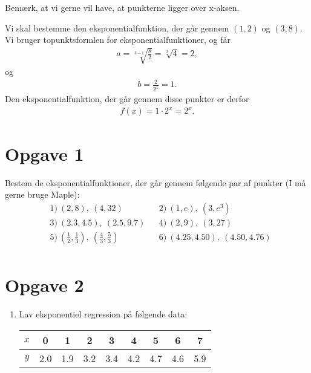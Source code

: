Bemærk, at vi gerne vil have, at punkterne ligger over x-aksen.
\begin{exa}
Vi skal bestemme den eksponentialfunktion, der går gennem $(1,2)$ og $(3,8)$. Vi bruger topunktsformlen for eksponentialfunktioner, og får
\begin{align*}
a = \sqrt[3-1]{\frac{8}{2}} = \sqrt[2]{4} = 2, 
\end{align*}
og 
\begin{align*}
b = \frac{2}{2^{1}} = 1.
\end{align*}
Den eksponentialfunktion, der går gennem disse punkter er derfor 
\begin{align*}
f(x) = 1\cdot 2^x = 2^x.
\end{align*}
\end{exa}

\section*{Opgave 1}
Bestem de eksponentialfunktioner, der går gennem følgende par af punkter (I må gerne bruge Maple):
\begin{align*}
&1) \ (2,8),\  (4,32)    &&2) \ (1,e), \ (3,e^3)     \\
&3) \ (2.3,4.5), \  (2.5,9.7)   &&4) \  (2,9), \ (3,27)    \\
&5) \ (\frac{1}{2},\frac{1}{3}), \ (\frac{4}{3},\frac{5}{3})   &&6) \ (4.25,4.50), \ (4.50,4.76)     \\
\end{align*}

\section*{Opgave 2}
\begin{enumerate}[label=\roman*)]
\item Lav eksponentiel regression på følgende data:
\begin{center}
\begin{tabular}{c|cccccccc}
$x$ & 0 & 1 & 2 & 3 & 4 & 5 & 6 & 7\\
\hline
$y$ & 2.0 & 1.9 & 3.2 & 3.4 & 4.2 & 4.7 & 4.6 & 5.9
\end{tabular}
\end{center}
\end{enumerate}

